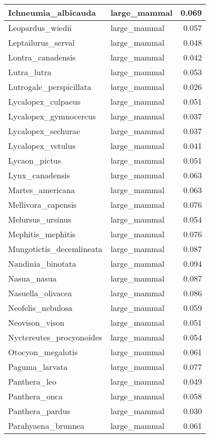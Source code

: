\begin{table}
\begin{tabular}[t]{l|l|r}
\hline
Ichneumia\_albicauda & large\_mammal & 0.069\\
\hline
Leopardus\_wiedii & large\_mammal & 0.057\\
\hline
Leptailurus\_serval & large\_mammal & 0.048\\
\hline
Lontra\_canadensis & large\_mammal & 0.042\\
\hline
Lutra\_lutra & large\_mammal & 0.053\\
\hline
Lutrogale\_perspicillata & large\_mammal & 0.026\\
\hline
Lycalopex\_culpaeus & large\_mammal & 0.051\\
\hline
Lycalopex\_gymnocercus & large\_mammal & 0.037\\
\hline
Lycalopex\_sechurae & large\_mammal & 0.037\\
\hline
Lycalopex\_vetulus & large\_mammal & 0.041\\
\hline
Lycaon\_pictus & large\_mammal & 0.051\\
\hline
Lynx\_canadensis & large\_mammal & 0.063\\
\hline
Martes\_americana & large\_mammal & 0.063\\
\hline
Mellivora\_capensis & large\_mammal & 0.076\\
\hline
Melursus\_ursinus & large\_mammal & 0.054\\
\hline
Mephitis\_mephitis & large\_mammal & 0.076\\
\hline
Mungotictis\_decemlineata & large\_mammal & 0.087\\
\hline
Nandinia\_binotata & large\_mammal & 0.094\\
\hline
Nasua\_nasua & large\_mammal & 0.087\\
\hline
Nasuella\_olivacea & large\_mammal & 0.086\\
\hline
Neofelis\_nebulosa & large\_mammal & 0.059\\
\hline
Neovison\_vison & large\_mammal & 0.051\\
\hline
Nyctereutes\_procyonoides & large\_mammal & 0.054\\
\hline
Otocyon\_megalotis & large\_mammal & 0.061\\
\hline
Paguma\_larvata & large\_mammal & 0.077\\
\hline
Panthera\_leo & large\_mammal & 0.049\\
\hline
Panthera\_onca & large\_mammal & 0.058\\
\hline
Panthera\_pardus & large\_mammal & 0.030\\
\hline
Parahyaena\_brunnea & large\_mammal & 0.061\\

\end{tabular}
\end{table}
